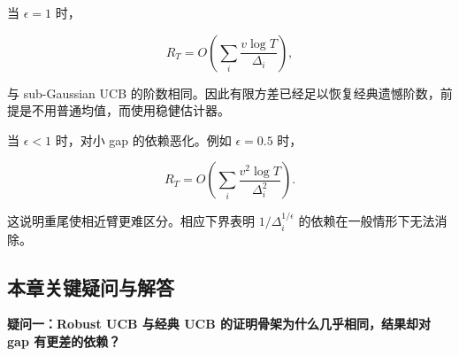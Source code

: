 \documentclass[
  11pt,
  a4paper,
]{ctexart}
\providecommand{\tightlist}{%
  \setlength{\itemsep}{0pt}\setlength{\parskip}{0pt}}
\begin{document}
当 \(\epsilon=1\) 时，

\[
R_T=O\left(\sum_i\frac{v\log T}{\Delta_i}\right),
\]

与 sub-Gaussian UCB
的阶数相同。因此有限方差已经足以恢复经典遗憾阶数，前提是不用普通均值，而使用稳健估计器。

当 \(\epsilon<1\) 时，对小 gap 的依赖恶化。例如 \(\epsilon=0.5\) 时，

\[
R_T=O\left(\sum_i\frac{v^2\log T}{\Delta_i^2}\right).
\]

这说明重尾使相近臂更难区分。相应下界表明 \(1/\Delta_i^{1/\epsilon}\)
的依赖在一般情形下无法消除。

\subsection{本章关键疑问与解答}\label{ux672cux7ae0ux5173ux952eux7591ux95ee-6}

\textbf{疑问一：Robust UCB 与经典 UCB 的证明骨架为什么几乎相同，结果却对 gap 有更差的依赖？}
\end{document}
